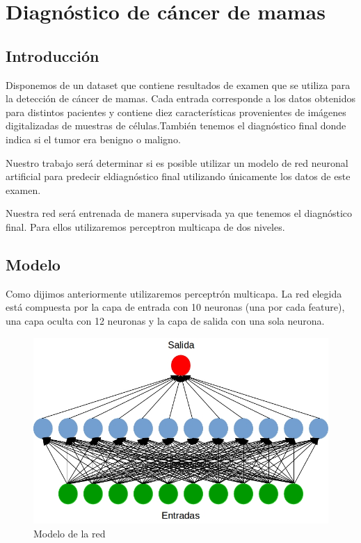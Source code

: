 \section{Diagnóstico de cáncer de mamas}


\subsection{Introducción}

Disponemos de un dataset que contiene resultados de examen que se utiliza para la detección de cáncer de mamas. Cada entrada 
corresponde a los datos obtenidos para distintos pacientes y contiene diez características provenientes de imágenes digitalizadas 
de muestras de células.También tenemos el diagnóstico final donde indica si el tumor era benigno o maligno. 

Nuestro trabajo será determinar si es posible utilizar un modelo de red neuronal artificial para predecir eldiagnóstico final utilizando
únicamente los datos de este examen.

Nuestra red será entrenada de manera supervisada ya que tenemos el diagnóstico final. Para ellos utilizaremos perceptron multicapa de 
dos niveles.


\subsection{Modelo}
Como dijimos anteriormente utilizaremos perceptrón multicapa. La red elegida está compuesta por la capa de entrada con 10 neuronas 
(una por cada feature), una capa oculta con 12 neuronas y la capa de salida con una sola neurona. 

\begin{figure}[ht!]
	\centering
	\includegraphics[width=1\linewidth]{fig/parte1-modelo.jpg}
	\caption{Modelo de la red}
\end{figure}

